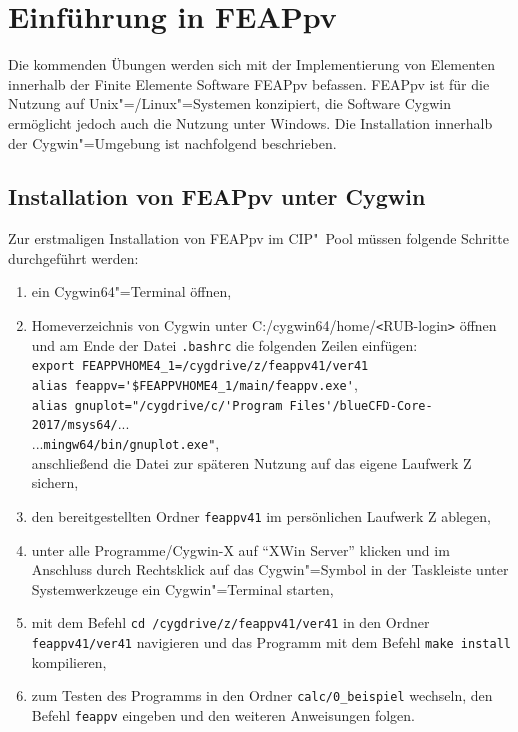 \clearpage
\setcounter{page}{1}

\section{Einführung in FEAPpv}


Die kommenden \"Ubungen werden sich mit der Implementierung von Elementen innerhalb der Finite Elemente Software FEAPpv befassen.
FEAPpv ist f\"ur die Nutzung auf Unix"=\slash{}Linux"=Systemen konzipiert, die Software Cygwin erm\"oglicht jedoch auch die Nutzung unter Windows. 
Die Installation innerhalb der Cygwin"=Umgebung ist nachfolgend beschrieben.


\subsection*{Installation von FEAPpv unter Cygwin}
Zur erstmaligen Installation von FEAPpv im CIP"~Pool m\"ussen folgende Schritte durchgef\"uhrt werden:
\begin{enumerate}[label=\arabic*.)]
 \item ein Cygwin64"=Terminal \"offnen,
 \item Homeverzeichnis von Cygwin unter C:/cygwin64/home/\verb|<|RUB-login\verb|>| \"offnen und am Ende der Datei \verb|.bashrc| die folgenden Zeilen einf\"ugen:\\[2mm]
 \verb|export FEAPPVHOME4_1=/cygdrive/z/feappv41/ver41|\\
 \verb|alias feappv='$FEAPPVHOME4_1/main/feappv.exe'|,\\
 \verb|alias gnuplot="/cygdrive/c/'Program Files'/blueCFD-Core-2017/msys64/|...\\
 ...\verb|mingw64/bin/gnuplot.exe"|,\\[2mm]
 anschlie{\ss}end die Datei zur sp\"ateren Nutzung auf das eigene Laufwerk Z sichern,
 \item den bereitgestellten Ordner \verb|feappv41| im pers\"onlichen Laufwerk Z ablegen,
  \item unter alle Programme/Cygwin-X auf \enquote{XWin Server} klicken und im Anschluss durch Rechtsklick auf das Cygwin"=Symbol in der Taskleiste unter Systemwerkzeuge ein Cygwin"=Terminal starten,
 \item mit dem Befehl \verb|cd /cygdrive/z/feappv41/ver41| in den Ordner \verb|feappv41/ver41| navigieren und das Programm mit dem Befehl \verb|make install| kompilieren,
 \item zum Testen des Programms in den Ordner \verb|calc/0_beispiel| wechseln, den Befehl \verb|feappv| eingeben und den weiteren Anweisungen folgen.
\end{enumerate}

